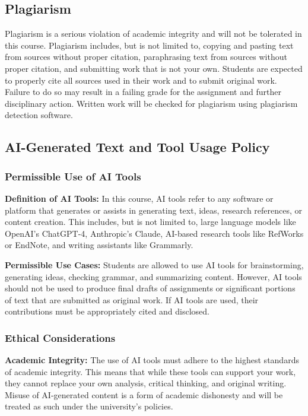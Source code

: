 \documentclass[12pt, letterpaper]{article}
\begin{document}
\subsection*{Plagiarism}
Plagiarism is a serious violation of academic integrity and will not be tolerated in this course. Plagiarism includes, but is not limited to, copying and pasting text from sources without proper citation, paraphrasing text from sources without proper citation, and submitting work that is not your own. Students are expected to properly cite all sources used in their work and to submit original work. Failure to do so may result in a failing grade for the assignment and further disciplinary action. Written work will be checked for plagiarism using plagiarism detection software.

\subsection*{AI-Generated Text and Tool Usage Policy}

\subsubsection*{Permissible Use of AI Tools}
\textbf{Definition of AI Tools:} In this course, AI tools refer to any software or platform that generates or assists in generating text, ideas, research references, or content creation. This includes, but is not limited to, large language models like OpenAI’s ChatGPT-4, Anthropic’s Claude, AI-based research tools like RefWorks or EndNote, and writing assistants like Grammarly.

\vspace{1ex}

\noindent\textbf{Permissible Use Cases:} Students are allowed to use AI tools for brainstorming, generating ideas, checking grammar, and summarizing content. However, AI tools should not be used to produce final drafts of assignments or significant portions of text that are submitted as original work. If AI tools are used, their contributions must be appropriately cited and disclosed.

\subsubsection*{Ethical Considerations}
\textbf{Academic Integrity:} The use of AI tools must adhere to the highest standards of academic integrity. This means that while these tools can support your work, they cannot replace your own analysis, critical thinking, and original writing. Misuse of AI-generated content is a form of academic dishonesty and will be treated as such under the university's policies.
\end{document}
